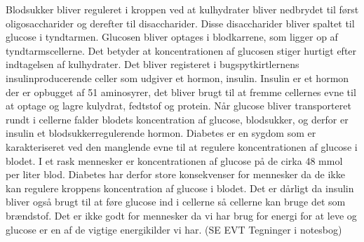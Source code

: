 Blodsukker bliver reguleret i kroppen ved at kulhydrater bliver nedbrydet til først oligosaccharider og derefter til disaccharider. Disse disaccharider bliver spaltet til glucose i tyndtarmen. Glucosen bliver optages i blodkarrene, som ligger op af tyndtarmscellerne. Det betyder at koncentrationen af glucosen stiger hurtigt efter indtagelsen af kulhydrater. Det bliver registeret i bugspytkirtlernens insulinproducerende celler som udgiver et hormon, insulin. Insulin er et hormon der er opbugget af 51 aminosyrer, det bliver brugt til at fremme cellernes evne til at optage og lagre kulydrat, fedtstof og protein. Når glucose bliver transporteret rundt i cellerne falder blodets koncentration af glucose, blodsukker, og derfor er insulin et blodsukkerregulerende hormon.
Diabetes er en sygdom som er karakteriseret ved den manglende evne til at regulere koncentrationen af glucose i blodet. I et rask mennesker er koncentrationen af glucose på de cirka 48 mmol per liter blod. Diabetes har derfor store konsekvenser for mennesker da de ikke kan regulere kroppens koncentration af glucose i blodet. Det er dårligt da insulin bliver også brugt til at føre glucose ind i cellerne så cellerne kan bruge det som brændstof. Det er ikke godt for mennesker da vi har brug for energi for at leve og glucose er en af de vigtige energikilder vi har.
(SE EVT Tegninger i notesbog)